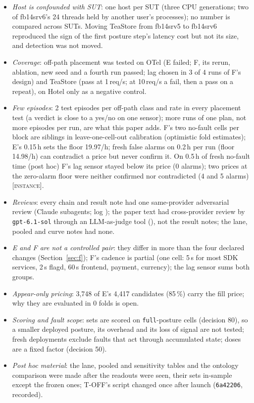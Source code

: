 \documentclass{ceurart}
\newcommand{\scope}[1]{\textsc{[#1]}}
\begin{document}
\begin{itemize}
\item \emph{Host is confounded with SUT}: one host per SUT (three CPU generations; two of fb14srv6's 24 threads held by
  another user's processes); no number is compared across SUTs. Moving TeaStore from fb14srv5 to fb14srv6 reproduced
  the sign of the first posture step's latency cost but not its size, and detection was not moved. %
\item \emph{Coverage}: off-path placement was tested on OTel (E failed; F, its rerun, ablation, new seed and a fourth run passed;
  lag chosen in 3 of 4 runs of F's design) and TeaStore (pass at 1\,req/s; at 10\,req/s a fail, then a pass on a repeat), on Hotel only as a negative control.
\item \emph{Few episodes}: 2 test episodes per off-path class and rate in every placement test (a verdict is close to a
  yes/no on one sensor); more runs of one plan, not more episodes per run, are what this paper adds. F's two no-fault cells
  per block are siblings in leave-one-cell-out calibration (optimistic fold estimates); E's 0.15\,h sets the floor 19.97/h;
  fresh false alarms on 0.2\,h per run (floor 14.98/h) can contradict a price but never confirm it. On 0.5\,h of fresh
  no-fault time (post hoc) F's lag sensor stayed below its price (0 alarms); two prices at the zero-alarm floor were neither
  confirmed nor contradicted (4 and 5 alarms) \scope{instance}. %
\item \emph{Reviews}: every chain and result note had one same-provider adversarial review (Claude subagents;
  log ); the paper text had cross-provider review by \texttt{gpt-6.1-sol} through an
  LLM-as-judge tool (), not the result notes; the lane, pooled and curve notes had none.
\item \emph{E and F are not a controlled pair}: they differ in more than the four declared changes (Section~\ref{sec:f});
  F's cadence is partial (one cell: 5\,s for most SDK services, 2\,s flagd, 60\,s frontend, payment, currency); the lag
  sensor sums both groups. %
\item \emph{Appear-only pricing}: 3,748 of E's 4,417 candidates (85\,\%) carry the fill price; why they are evaluated in 0
  folds is open. %
\item \emph{Scoring and fault scope}: sets are scored on \texttt{full}-posture cells (decision 80), so a smaller deployed
  posture, its overhead and its loss of signal are not tested; fresh deployments exclude faults that act through accumulated
  state; doses are a fixed factor (decision 50).
\item \emph{Post hoc material}: the lane, pooled and sensitivity tables and the ontology comparison were made after the
  readouts were seen, their sets in-sample except the frozen ones; T-OFF's script changed once after launch (\texttt{6a42206}, recorded).
\end{itemize}
\end{document}
